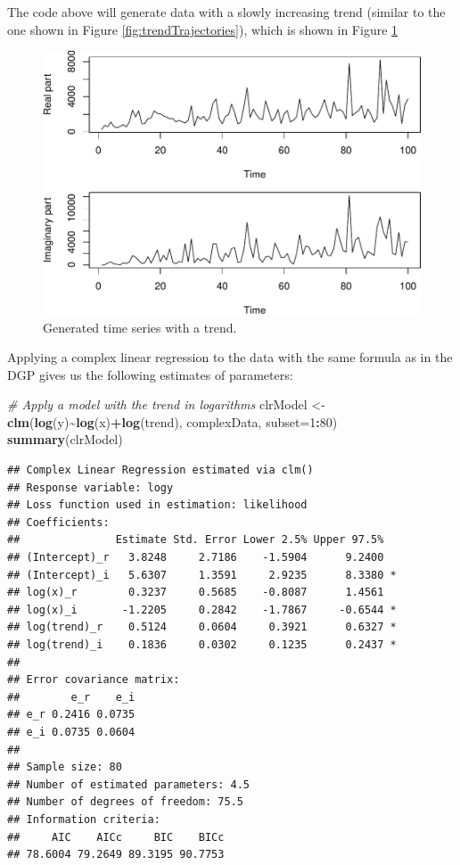 \documentclass[
]{book}
\newenvironment{Shaded}{\begin{snugshade}}{\end{snugshade}}
\newcommand{\CommentTok}[1]{\textcolor[rgb]{0.56,0.35,0.01}{\textit{#1}}}
\newcommand{\DataTypeTok}[1]{\textcolor[rgb]{0.13,0.29,0.53}{#1}}
\newcommand{\DecValTok}[1]{\textcolor[rgb]{0.00,0.00,0.81}{#1}}
\newcommand{\KeywordTok}[1]{\textcolor[rgb]{0.13,0.29,0.53}{\textbf{#1}}}
\newcommand{\NormalTok}[1]{#1}
\newcommand{\OperatorTok}[1]{\textcolor[rgb]{0.81,0.36,0.00}{\textbf{#1}}}
\newcommand{\StringTok}[1]{\textcolor[rgb]{0.31,0.60,0.02}{#1}}
\begin{document}
The code above will generate data with a slowly increasing trend (similar to the one shown in Figure \ref{fig:trendTrajectories}), which is shown in Figure \ref{fig:dataWithTrend}

\begin{figure}
\centering
\includegraphics{Svetunkov---Svetunkov---Complex-Valued-Econometrics_files/figure-latex/dataWithTrend-1.pdf}
\caption{\label{fig:dataWithTrend}Generated time series with a trend.}
\end{figure}

Applying a complex linear regression to the data with the same formula as in the DGP gives us the following estimates of parameters:

\begin{Shaded}
\begin{Highlighting}[]
\CommentTok{\# Apply a model with the trend in logarithms}
\NormalTok{clrModel \textless{}{-}}\StringTok{ }\KeywordTok{clm}\NormalTok{(}\KeywordTok{log}\NormalTok{(y)}\OperatorTok{\textasciitilde{}}\KeywordTok{log}\NormalTok{(x)}\OperatorTok{+}\KeywordTok{log}\NormalTok{(trend), complexData, }\DataTypeTok{subset=}\DecValTok{1}\OperatorTok{:}\DecValTok{80}\NormalTok{)}
\KeywordTok{summary}\NormalTok{(clrModel)}
\end{Highlighting}
\end{Shaded}

\begin{verbatim}
## Complex Linear Regression estimated via clm()
## Response variable: logy
## Loss function used in estimation: likelihood
## Coefficients:
##               Estimate Std. Error Lower 2.5% Upper 97.5%  
## (Intercept)_r   3.8248     2.7186    -1.5904      9.2400  
## (Intercept)_i   5.6307     1.3591     2.9235      8.3380 *
## log(x)_r        0.3237     0.5685    -0.8087      1.4561  
## log(x)_i       -1.2205     0.2842    -1.7867     -0.6544 *
## log(trend)_r    0.5124     0.0604     0.3921      0.6327 *
## log(trend)_i    0.1836     0.0302     0.1235      0.2437 *
## 
## Error covariance matrix:
##        e_r    e_i
## e_r 0.2416 0.0735
## e_i 0.0735 0.0604
## 
## Sample size: 80
## Number of estimated parameters: 4.5
## Number of degrees of freedom: 75.5
## Information criteria:
##     AIC    AICc     BIC    BICc 
## 78.6004 79.2649 89.3195 90.7753
\end{verbatim}
\end{document}
